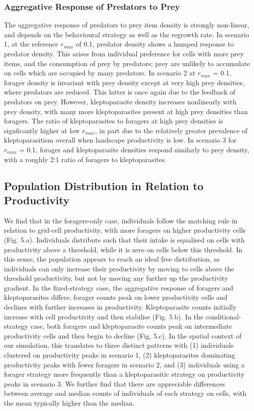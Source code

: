 \documentclass[11pt]{article}
\begin{document}
\subsubsection{Aggregative Response of Predators to Prey}

The aggregative response of predators to prey item density is strongly non-linear, and depends on the behavioural strategy as well as the regrowth rate.
In scenario 1, at the reference $r_{max}$ of 0.1, predator density shows a humped response to predator density. 
This arises from individual preference for cells with more prey items, and the consumption of prey by predators; prey are unlikely to accumulate on cells which are occupied by many predators.
In scenario 2 at $r_{max}$ = 0.1, forager density is invariant with prey density except at very high prey densities, where predators are reduced.
This latter is once again due to the feedback of predators on prey.
However, kleptoparasite density increases nonlinearly with prey density, with many more kleptoparasites present at high prey densities than foragers.
The ratio of kleptoparasites to foragers at high prey densities is signficantly higher at low $r_{max}$, in part due to the relatively greater prevalence of kleptoparasitism overall when landscape productivity is low.
In scenario 3 for $r_{max}$ = 0.1, forager and kleptoparasite densities respond similarly to prey density, with a roughly 2:1 ratio of foragers to kleptoparasites.

\subsection{Population Distribution in Relation to Productivity}

We find that in the foragers-only case, individuals follow the matching rule in relation to grid-cell productivity, with more foragers on higher productivity cells (Fig. 5.a).
Individuals distribute such that their intake is equalised on cells with productivity above a threshold, while it is zero on cells below this threshold.
In this sense, the population appears to reach an ideal free distribution, as individuals can only increase their productivity by moving to cells above the threshold productivity, but not by moving any further up the productivity gradient.
In the fixed-strategy case, the aggregative response of foragers and kleptoparasites differs; forager counts peak on lower productivity cells and declines with further increases in productivity.
Kleptoparasite counts initially increase with cell productivity and then stabilise (Fig. 5.b).
In the conditional-strategy case, both foragers and kleptoparasite counts peak on intermediate productivity cells and then begin to decline (Fig. 5.c).
In the spatial context of our simulation, this translates to three distinct patterns with (1) individuals clustered on productivity peaks in scenario 1, (2) kleptoparasites dominating productivity peaks with fewer foragers in scenario 2, and (3) individuals using a forager strategy more frequently than a kleptoparasitic strategy on productivity peaks in scenario 3.
We further find that there are appreciable differences between average and median counts of individuals of each strategy on cells, with the mean typically higher than the median.
\end{document}
